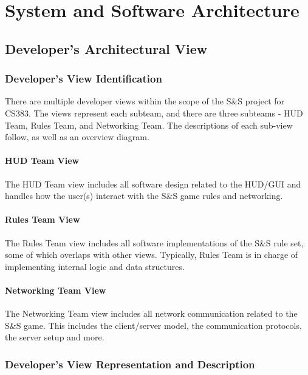 \documentclass[12pt,a4paper,titlepage]{article}
\begin{document}
\section{System and Software Architecture}
\subsection{Developer's Architectural View}
\subsubsection{Developer's View Identification}
There are multiple developer views within the scope of the S\&S project for CS383. The views represent each subteam, and there are three subteams - HUD Team, Rules Team, and Networking Team. The descriptions of each sub-view follow, as well as an overview diagram.
\paragraph{HUD Team View} The HUD Team view includes all software design related to the HUD/GUI and handles how the user(s) interact with the S\&S game rules and networking. 
\paragraph{Rules Team View} The Rules Team view includes all software implementations of the S\&S rule set, some of which overlaps with other views. Typically, Rules Team is in charge of implementing internal logic and data structures.
\paragraph{Networking Team View} The Networking Team view includes all network communication related to the S\&S game. This includes the client/server model, the communication protocols, the server setup and more.
\subsubsection{Developer's View Representation and Description}
\end{document}

